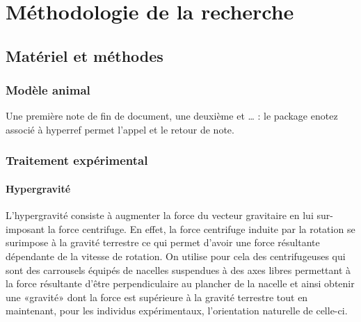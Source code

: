 \chapter{ Méthodologie de la recherche}
\chaptertoc{}

\section{Matériel et méthodes}

	\subsection{Modèle animal}

	\lipsum[1]

	Une première note de fin de document, une deuxième et \ldots {}      : le package enotez associé à hyperref permet l'appel et le retour de note.

	\subsection{Traitement expérimental}

		\subsubsection{Hypergravité}
			\label{hypergravite} %

			L'hypergravité consiste à augmenter la force du vecteur gravitaire en lui sur-imposant la force centrifuge. En effet, la force centrifuge induite par la rotation se surimpose à la gravité terrestre ce qui permet d'avoir une force résultante dépendante de la vitesse de rotation. On utilise pour cela des centrifugeuses qui sont des carrousels équipés de nacelles suspendues à des axes libres permettant à la force résultante d'être perpendiculaire au plancher de la nacelle et ainsi obtenir une «gravité» dont la force est supérieure à la gravité terrestre tout en maintenant, pour les individus expérimentaux, l'orientation \og naturelle \fg de celle-ci.

